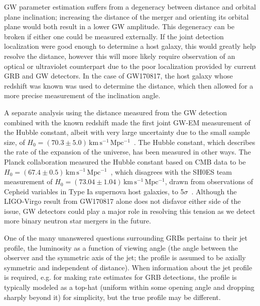 \ac{GW} parameter estimation suffers from a degeneracy between distance and orbital plane inclination; increasing the distance of the merger and orienting its orbital plane would both result in a lower \ac{GW} amplitude.
This degeneracy can be broken if either one could be measured externally.
If the joint detection localization were good enough to determine a host galaxy, this would greatly help resolve the distance, however this will more likely require observation of an optical or ultraviolet counterpart due to the poor localization provided by current \ac{GRB} and \ac{GW} detectors.
In the case of GW170817, the host galaxy whose redshift was known was used to determine the distance, which then allowed for a more precise measurement of the inclination angle.

A separate analysis using the distance measured from the \ac{GW} detection combined with the known redshift made the first joint \ac{GW}-EM measurement of the Hubble constant, albeit with very large uncertainty due to the small sample size, of $H_0 = (70.3 \pm 5.0)\,\mathrm{km\,s^{-1}\,Mpc^{-1}}$~\citep{gw170817_hubble}.
The Hubble constant, which describes the rate of the expansion of the universe, has been measured in other ways.
The Planck collaboration measured the Hubble constant based on \ac{CMB} data to be $H_0 = (67.4 \pm 0.5)\,\mathrm{km\,s^{-1}\,Mpc^{-1}}$~\citep{Planck_2020},
which disagrees with the SH0ES team measurement of $H_0 = (73.04 \pm 1.04)\,\mathrm{km\,s^{-1}\,Mpc^{-1}}$, drawn from observations of Cepheid variables in Type Ia supernova host galaxies, to 5$\sigma$~\citep{Shoes_2018}.
Although the LIGO-Virgo result from GW170817 alone does not disfavor either side of the issue, GW detectors could play a major role in resolving this tension as we detect more binary neutron star mergers in the future.

One of the many unanswered questions surrounding \acp{GRB} pertains to their jet profile, the luminosity as a function of viewing angle (the angle between the observer and the symmetric axis of the jet; the profile is assumed to be axially symmetric and independent of distance).
When information about the jet profile is required, e.g. for making rate estimates for \ac{GRB} detections, the profile is typically modeled as a top-hat (uniform within some opening angle and dropping sharply beyond it) for simplicity, but the true profile may be different.

